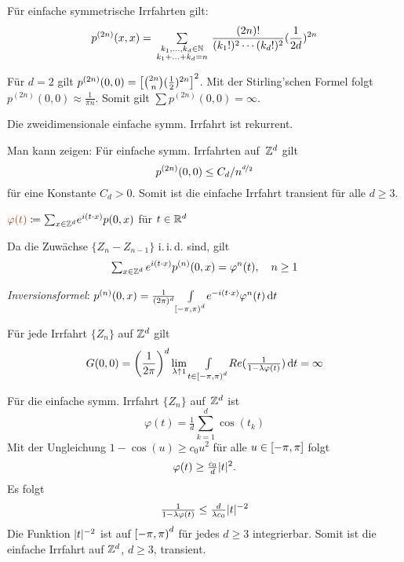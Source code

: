 \documentclass{cheat-sheet}
\newcommand{\iid}{i.\,i.\,d.} %
\newcommand{\Defn}[1]{\textcolor{DefinitionColor}{#1}}
\begin{document}
\begin{bem}
  Für einfache symmetrische Irrfahrten gilt:
  \[
    p^{(2n)}(x, x) = \qquad \sum_{\mathclap{\substack{k_1, \ldots, k_d \in \N \\ k_1 + \ldots + k_d = n}}} \qquad \frac{(2n)!}{(k_1!)^2 \cdots (k_d!)^2} (\frac{1}{2d})^{2n}
  \]

  Für $d = 2$ gilt $p^{(2n)}(0, 0) = \left[ \tbinom{2n}{n} (\tfrac{1}{2})^{2n} \right]^2$.
  Mit der Stirling'schen Formel folgt $p^{(2n)}(0, 0) \approx \tfrac{1}{\pi n}$.
  Somit gilt $\sum p^{(2n)}(0,0) = \infty$.
\end{bem}

\begin{fazit}
  Die zweidimensionale einfache symm. Irrfahrt ist rekurrent.
\end{fazit}


\begin{bem}
  Man kann zeigen:
  Für einfache symm. Irrfahrten auf~$\mathbb{Z}^d$ gilt
  \[ p^{(2n)}(0,0) \leq C_d / n^{\nicefrac{d}{2}} \]
  für eine Konstante $C_d > 0$.
  Somit ist die einfache Irrfahrt transient für alle $d \geq 3$.
\end{bem}

\begin{defn}
  $\Defn{\varphi(t)} \coloneqq {\sum}_{x \in \Z^d} e^{i (t \cdot x)} p(0, x)$ \quad
  für $t \in \mathbb{R}^d$
\end{defn}

\begin{bem}
  Da die Zuwächse $\{ Z_n - Z_{n-1} \}$ \iid{} sind, gilt
  \[ {\sum}_{x \in \Z^d} \, e^{i (t \cdot x)} p^{(n)}(0, x) = \varphi^n(t), \quad n \geq 1 \]

  \textit{Inversionsformel}: \quad
  $p^{(n)}(0, x) = \tfrac{1}{(2 \pi)^d} {\textstyle \int\limits_{\left[ -\pi, \pi \right)^d}^{}} e^{- i (t \cdot x)} \varphi^n(t) \,\mathrm{d} t$
\end{bem}

\begin{satz}
  Für jede Irrfahrt $\{ Z_n \}$ auf $\mathbb{Z}^d$ gilt
  \[ G(0, 0) = \left( \frac{1}{2 \pi} \right)^d \lim_{\lambda \uparrow 1} {\textstyle \int\limits_{t \in \left[ -\pi, \pi \right)^d}^{}} Re(\tfrac{1}{1 - \lambda \varphi(t)}) \,\mathrm{d} t = \infty \]
\end{satz}

\begin{bsp}
  Für die einfache symm. Irrfahrt $\{ Z_n \}$ auf~$\mathbb{Z}^d$ ist
  \[
    \varphi(t) = \tfrac{1}{d} {\sum}_{k=1}^d \cos(t_k)
  \]
  Mit der Ungleichung $1 - \cos(u) \geq c_0 u^2$ für alle $u \in \left[ - \pi, \pi \right]$ folgt
  \[
    \varphi(t) \geq \tfrac{c_0}{d} \lvert t\rvert^2.
  \]
  Es folgt
  \[
    \tfrac{1}{1 - \lambda \varphi(t)} \leq \tfrac{d}{\lambda c_0} \lvert t\rvert^{-2}
  \]
  Die Funktion $\lvert t\rvert^{-2}$ ist auf $\left[ -\pi, \pi \right)^d$ für jedes $d \geq 3$ integrierbar.
  Somit ist die einfache Irrfahrt auf $\mathbb{Z}^d$, $d \geq 3$, transient.
\end{bsp}
\end{document}
